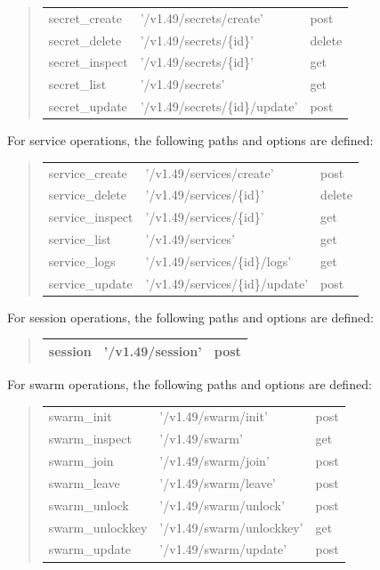 \begin{description}
\begin{quote}
\begin{tabulary}{0.9\textwidth}{|l|L|l|}
\hline
secret_create & '/v1.49/secrets/create' & post \\
secret_delete & '/v1.49/secrets/\{id\}' & delete \\
secret_inspect & '/v1.49/secrets/\{id\}' & get \\
secret_list & '/v1.49/secrets' & get \\
secret_update & '/v1.49/secrets/\{id\}/update' & post \\
\hline
\end{tabulary}
\end{quote}

For service operations, the following paths and options are defined:

\begin{quote}
\begin{tabulary}{0.9\textwidth}{|l|L|l|}
\hline
service_create & '/v1.49/services/create' & post \\
service_delete & '/v1.49/services/\{id\}' & delete \\
service_inspect & '/v1.49/services/\{id\}' & get \\
service_list & '/v1.49/services' & get \\
service_logs & '/v1.49/services/\{id\}/logs' & get \\
service_update & '/v1.49/services/\{id\}/update' & post \\
\hline
\end{tabulary}
\end{quote}

For session operations, the following paths and options are defined:

\begin{quote}
\begin{tabulary}{0.9\textwidth}{|l|L|l|}
\hline
session & '/v1.49/session' & post \\
\hline
\end{tabulary}
\end{quote}

For swarm operations, the following paths and options are defined:

\begin{quote}
\begin{tabulary}{0.9\textwidth}{|l|L|l|}
\hline
swarm_init & '/v1.49/swarm/init' & post \\
swarm_inspect & '/v1.49/swarm' & get \\
swarm_join & '/v1.49/swarm/join' & post \\
swarm_leave & '/v1.49/swarm/leave' & post \\
swarm_unlock & '/v1.49/swarm/unlock' & post \\
swarm_unlockkey & '/v1.49/swarm/unlockkey' & get \\
swarm_update & '/v1.49/swarm/update' & post \\
\hline
\end{tabulary}
\end{quote}


\end{description}

